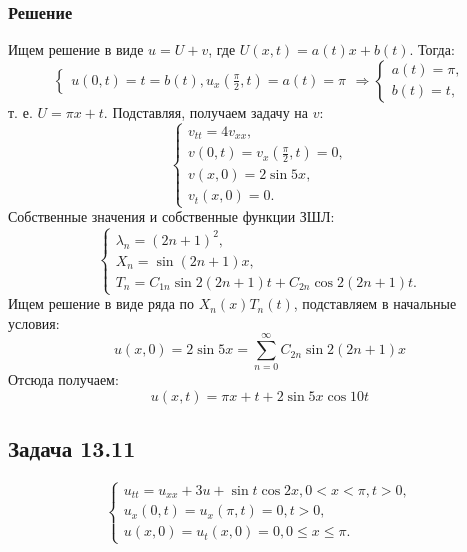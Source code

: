 \documentclass[11pt]{article}
\begin{document}
\subsubsection{Решение}
\label{sec:org121bafa}
Ищем решение в виде $u = U + v$, где $U(x, t) = a(t)x + b(t)$. Тогда:
\begin{equation}
\begin{cases}
u(0, t) = t = b(t), 
u_x\left(\frac{\pi}2, t\right) = a(t) = \pi
\end{cases}
\Rightarrow
\begin{cases}
a(t) = \pi, \\
b(t) = t,
\end{cases}
\end{equation}
т. е. $U = \pi x + t$. Подставляя, получаем задачу на $v$:
\begin{equation}
\begin{cases}
v_{tt} = 4v_{xx}, \\
v(0, t) = v_x\left(\frac{\pi}2, t\right) = 0, \\
v(x, 0) = 2\sin5x, \\
v_t(x, 0) = 0.
\end{cases}
\end{equation}
Собственные значения и собственные функции ЗШЛ:
\begin{equation}
\begin{cases}
\lambda_n = (2n + 1)^2, \\
X_n = \sin(2n + 1)x, \\
T_n = C_{1n}\sin2(2n + 1)t + C_{2n}\cos2(2n + 1)t.
\end{cases}
\end{equation}
Ищем решение в виде ряда по $X_n(x)T_n(t)$, подставляем в начальные условия:
\begin{equation}
u(x, 0) = 2\sin5x = \sum_{n = 0}^{\infty}C_{2n}\sin2(2n + 1)x
\end{equation}
Отсюда получаем:
\begin{equation}
u(x, t) = \pi x + t + 2\sin5x\cos10t
\end{equation}
\subsection{Задача 13.11}
\label{sec:orgf495708}
\begin{equation}
\begin{cases}
u_{tt} = u_{xx} + 3u + \sin t\cos2x, 0 < x < \pi, t > 0, \\
u_x(0, t) = u_x(\pi, t) = 0, t > 0, \\
u(x, 0) = u_t(x, 0) = 0, 0 \leq x \leq \pi.
\end{cases}
\end{equation}
\end{document}
